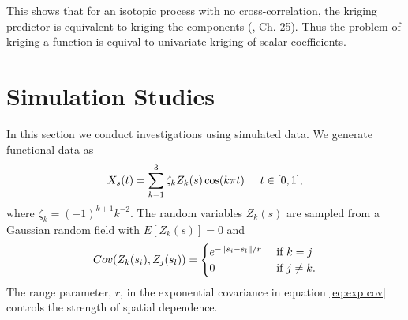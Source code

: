 This shows that for an isotopic process with no cross-correlation, the kriging predictor is equivalent to kriging the components (\cite{wackernagel2003multivariate}, Ch. 25). Thus the problem of kriging a function is equival to univariate kriging of scalar coefficients. 

	



\section{Simulation Studies} 

\label{sec:numerical_experiments}

In this section we conduct investigations using simulated data. We generate functional data as
\begin{equation}
	X_s(t) = \sum^{3}_{k=1}\zeta_k Z_k(s) \cos(k\pi t) \hspace{0.5cm} t \in [0,1], 
	\label{eq:sim process2} 
\end{equation}
where \(\zeta_k=(-1)^{k+1}k^{-2}\). The random variables $Z_k(s)$ are sampled from a Gaussian random field with $E[Z_k(s)]=0$ and 
\begin{equation}
	Cov(Z_k(s_i), Z_j(s_l)) = \begin{cases} 
																e^{-\left\|s_i - s_l\right\|/r} &\mbox{ if } k = j\\
																0 & \mbox{ if } j \neq k.
															\end{cases}
	\label{eq:exp cov}
\end{equation} 
The range parameter, $r$, in the exponential covariance in equation \eqref{eq:exp cov} controls the strength of spatial dependence. 

